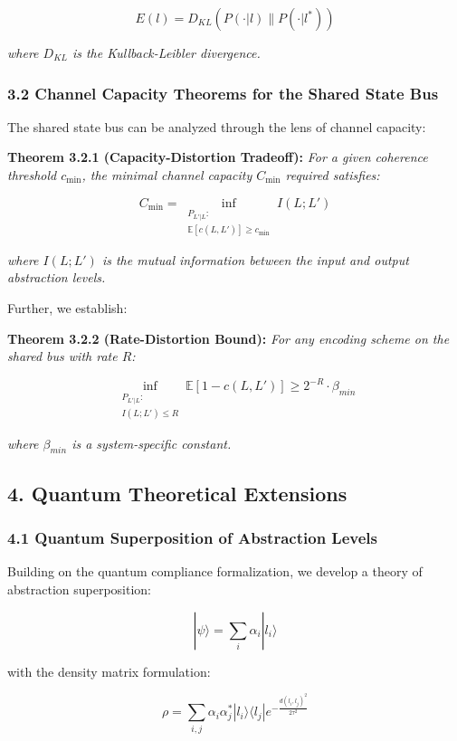 \documentclass[
]{article}
\begin{document}
\[E(l) = D_{KL}(P(\cdot|l) \| P(\cdot|l^*))\]

\emph{where \(D_{KL}\) is the Kullback-Leibler divergence.}

\subsubsection{3.2 Channel Capacity Theorems for the Shared State
Bus}\label{channel-capacity-theorems-for-the-shared-state-bus}

The shared state bus can be analyzed through the lens of channel
capacity:

\textbf{Theorem 3.2.1 (Capacity-Distortion Tradeoff):} \emph{For a given
coherence threshold \(c_{\min}\), the minimal channel capacity
\(C_{\min}\) required satisfies:}

\[C_{\min} = \inf_{\substack{P_{L'|L}: \\ \mathbb{E}[c(L,L')] \geq c_{\min}}} I(L; L')\]

\emph{where \(I(L; L')\) is the mutual information between the input and
output abstraction levels.}

Further, we establish:

\textbf{Theorem 3.2.2 (Rate-Distortion Bound):} \emph{For any encoding
scheme on the shared bus with rate \(R\):}

\[\inf_{\substack{P_{L'|L}: \\ I(L;L') \leq R}} \mathbb{E}[1-c(L,L')] \geq 2^{-R} \cdot \beta_{min}\]

\emph{where \(\beta_{min}\) is a system-specific constant.}

\subsection{4. Quantum Theoretical
Extensions}\label{quantum-theoretical-extensions}

\subsubsection{4.1 Quantum Superposition of Abstraction
Levels}\label{quantum-superposition-of-abstraction-levels}

Building on the quantum compliance formalization, we develop a theory of
abstraction superposition:

\[|\psi\rangle = \sum_i \alpha_i |l_i\rangle\]

with the density matrix formulation:

\[\rho = \sum_{i,j} \alpha_i \alpha_j^* |l_i\rangle\langle l_j| e^{-\frac{d(l_i,l_j)^2}{2\tau^2}}\]
\end{document}
